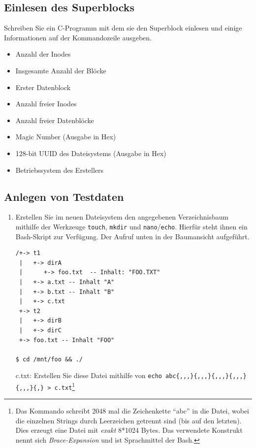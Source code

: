 \documentclass[11pt,a4paper]{article}
\def\inlinebash{\lstinline[style=bash]}
\begin{document}
\subsection{Einlesen des Superblocks}
Schreiben Sie ein C-Programm mit dem sie den Superblock einlesen und
einige Informationen auf der Kommandozeile ausgeben.

\begin{itemize}
	\item Anzahl der Inodes
	\item Insgesamte Anzahl der Blöcke
	\item Erster Datenblock
	\item Anzahl freier Inodes
	\item Anzahl freier Datenblöcke
	\item Magic Number (Ausgabe in Hex)
	\item 128-bit UUID des Dateisystems (Ausgabe in Hex)
	\item Betriebssystem des Erstellers
\end{itemize}

\subsection{Anlegen von Testdaten}

\begin{enumerate}
\item Erstellen Sie im neuen Dateisystem den angegebenen Verzeichnisbaum 
	mithilfe der Werkzeuge \inlinebash$touch$, \inlinebash$mkdir$ und 
	\inlinebash$nano$\slash\inlinebash$echo$. Hierfür steht ihnen ein Bash-Skript 
	zur Verfügung. Der Aufruf unten in der Baumansicht aufgeführt.

\begin{verbatim}
/+-> t1
 |   +-> dirA
 |      +-> foo.txt  -- Inhalt: "FOO.TXT"
 |   +-> a.txt -- Inhalt "A"
 |   +-> b.txt -- Inhalt "B" 
 |   +-> c.txt 
 +-> t2
 |   +-> dirB
 |   +-> dirC
 +-> foo.txt -- Inhalt "FOO"
 
$ cd /mnt/foo && ./
\end{verbatim}


	c.txt: Erstellen Sie diese Datei mithilfe von
	\inlinebash$echo abc{,,,}{,,,}{,,,}{,,,}{,,,}{,} > c.txt$\footnote{Das Kommando 
	schreibt 2048 mal die Zeichenkette ``abc'' in die Datei, wobei die einzelnen
	Strings durch Leerzeichen getrennt sind (bis auf den letzten). 
	Dies erzeugt eine Datei mit \emph{exakt} 8*1024 Bytes.
	Das verwendete Konstrukt nennt sich \emph{Brace-Expansion} 
	und ist Sprachmittel der Bash.}
\end{enumerate}
\end{document}
